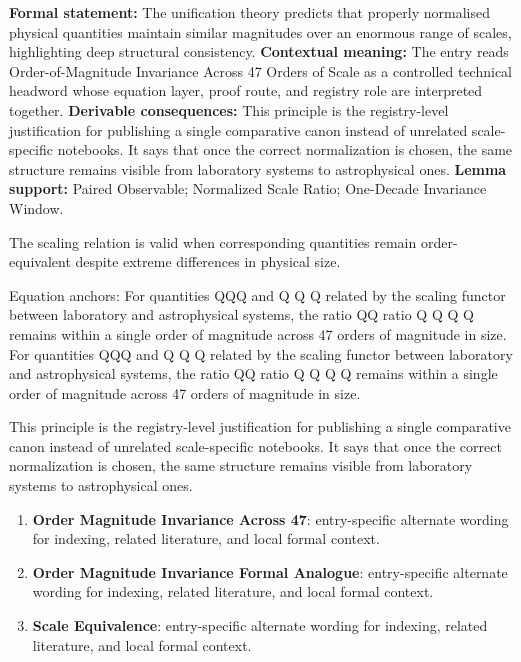 \begingroup\footnotesize\setlength{\emergencystretch}{3em}\sloppy
\textbf{Formal statement:} The unification theory predicts that properly normalised physical quantities maintain similar magnitudes over an enormous range of scales, highlighting deep structural consistency. \textbf{Contextual meaning:} The entry reads Order-of-Magnitude Invariance Across 47 Orders of Scale as a controlled technical headword whose equation layer, proof route, and registry role are interpreted together. \textbf{Derivable consequences:} This principle is the registry-level justification for publishing a single comparative canon instead of unrelated scale-specific notebooks. It says that once the correct normalization is chosen, the same structure remains visible from laboratory systems to astrophysical ones. \textbf{Lemma support:} Paired Observable; Normalized Scale Ratio; One-Decade Invariance Window.\par
\endgroup

The scaling relation is valid when corresponding quantities remain order-equivalent despite extreme differences in physical size.

Equation anchors: For quantities QQQ and Q Q Q  related by the scaling functor between laboratory and astrophysical systems, the ratio QQ ratio Q Q Q Q remains within a single order of magnitude across 47 orders of magnitude in size. For quantities QQQ and Q Q Q  related by the scaling functor between laboratory and astrophysical systems, the ratio QQ ratio Q Q Q Q remains within a single order of magnitude across 47 orders of magnitude in size.

This principle is the registry-level justification for publishing a single comparative canon instead of unrelated scale-specific notebooks. It says that once the correct normalization is chosen, the same structure remains visible from laboratory systems to astrophysical ones.
\endgroup

\begingroup\footnotesize\sloppy
\begin{enumerate}[leftmargin=1.35em,itemsep=1pt,topsep=1pt,parsep=0pt]
\item \textbf{Order Magnitude Invariance Across 47}: entry-specific alternate wording for indexing, related literature, and local formal context.
\item \textbf{Order Magnitude Invariance Formal Analogue}: entry-specific alternate wording for indexing, related literature, and local formal context.
\item \textbf{Scale Equivalence}: entry-specific alternate wording for indexing, related literature, and local formal context.
\end{enumerate}
\endgroup

